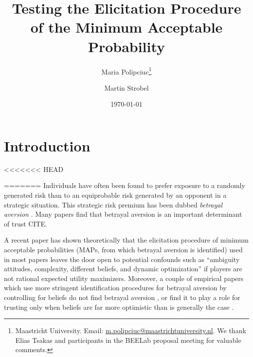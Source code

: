 
\title{Testing the Elicitation Procedure \\ of the Minimum Acceptable Probability}
\author{Maria Polipciuc\thanks{Maastricht University. Email: \url{m.polipciuc@maastrichtuniversity.nl}. We thank Elias Tsakas and participants in the BEELab proposal meeting for valuable comments.} \and Martin Strobel\footnotemark[1]}
\date{\today	\vspace{1cm}}
\titlepage



\begin{titlepage}
\clearpage
\maketitle
\thispagestyle{empty}


\begin{abstract}

\end{abstract}
\end{titlepage}


\section{Introduction}\label{sec:intro}
<<<<<<< HEAD

=======
Individuals have often been found to prefer exposure to a randomly generated risk than to an equiprobable risk generated by an opponent in a strategic situation.
This strategic risk premium has been dubbed \textit{betrayal aversion} \citep{Bohnet2004}.
Many papers find that betrayal aversion is an important determinant of trust CITE.

A recent paper has shown theoretically that the elicitation procedure of minimum acceptable probabilities (MAPs, from which betrayal aversion is identified) used in most papers leaves the door open to potential confounds such as ``ambiguity attitudes, complexity, different beliefs, and dynamic optimization'' \citep{Li2020a} if players are not rational expected utility maximizers.
Moreover, a couple of empirical papers which use more stringent identification procedures for betrayal aversion by controlling for beliefs do not find betrayal aversion \citep{Fetchenhauer2012,Polipciuc2021}, or find it to play a role for trusting only when beliefs are far more optimistic than is generally the case \citep{Engelmann2021}.

